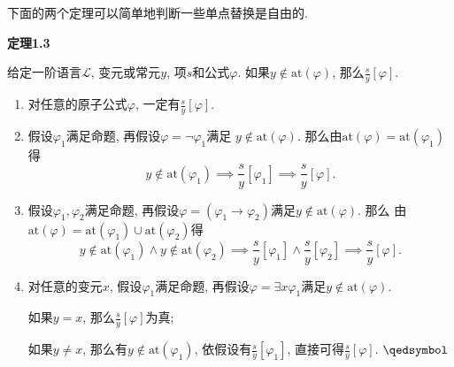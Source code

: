 \documentclass[UTF8]{ctexart}
\begin{document}
\newpage

下面的两个定理可以简单地判断一些单点替换是自由的.



\vspace{10pt}

\hypertarget{sec:定理1.3}{}
\noindent\textbf{定理1.3}

给定一阶语言$\mathcal{L}$, 变元或常元$y$, 项$s$和公式$\varphi$.
如果$y\notin\mathrm{at}(\varphi)$, 那么$\displaystyle\frac{s}{y}[\varphi]$.


\begin{enumerate}
    \item 对任意的原子公式$\varphi$, 一定有$\displaystyle\frac{s}{y}[\varphi]$.
    
    \vspace{3pt}
    \item 假设$\varphi_1$满足命题, 再假设$\varphi=\neg\varphi_1$满足
    $y\notin\mathrm{at}(\varphi)$.
    那么由$\mathrm{at}(\varphi)=\mathrm{at}(\varphi_1)$得
    \vspace{3pt}
    \[
        y\notin\mathrm{at}(\varphi_1)\implies
        \frac{s}{y}[\varphi_1]\implies\frac{s}{y}[\varphi].
    \]

    \vspace{3pt}
    \item 假设$\varphi_1,\varphi_2$满足命题,
    再假设$\varphi=(\varphi_1\to\varphi_2)$满足$y\notin\mathrm{at}(\varphi)$. 那么
    由$\mathrm{at}(\varphi)=\mathrm{at}(\varphi_1)\cup\mathrm{at}(\varphi_2)$得
    \vspace{3pt}
    \[
        y\notin\mathrm{at}(\varphi_1)\land y\notin\mathrm{at}(\varphi_2)\implies
        \frac{s}{y}[\varphi_1]\land\frac{s}{y}[\varphi_2]\implies
        \frac{s}{y}[\varphi].
    \]

    \item 对任意的变元$x$, 假设$\varphi_1$满足命题,
    再假设$\varphi=\exists x\varphi_1$满足$y\notin\mathrm{at}(\varphi)$.

    \vspace{3pt}\hspace{2.17em}
    如果$y=x$, 那么$\displaystyle\frac{s}{y}[\varphi]$为真;

    \vspace{3pt}\hspace{2.17em}
    如果$y\neq x$, 那么有$y\notin\mathrm{at}(\varphi_1)$,
    依假设有$\displaystyle\frac{s}{y}[\varphi_1]$,
    直接可得$\displaystyle\frac{s}{y}[\varphi]$. \hfill $\qedsymbol$
\end{enumerate}
\end{document}
